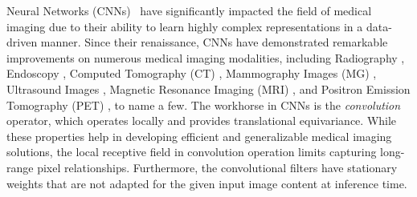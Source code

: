 \documentclass[10pt,journal,compsoc]{IEEEtran}
\begin{document}
\IEEEdisplaynontitleabstractindextext

\IEEEpeerreviewmaketitle

 Neural Networks (CNNs)~\cite{goodfellow2016deep,lecun1989backpropagation,krizhevsky2012imagenet,liu2022convnet} have significantly impacted the field of medical imaging
due to their ability to learn highly complex representations in a data-driven manner. Since their renaissance, CNNs have %
demonstrated remarkable improvements on numerous medical imaging modalities, including Radiography \cite{lakhani2017deep}, Endoscopy \cite{min2019overview}, Computed Tomography (CT) \cite{wurfl2016deep,lell2020recent}, Mammography Images (MG) \cite{hamidinekoo2018deep}, Ultrasound Images \cite{liu2019deep}, Magnetic Resonance Imaging (MRI) \cite{lundervold2019overview,akkus2017deep}, and Positron Emission Tomography (PET) \cite{reader2020deep}, to name a few.
The workhorse in CNNs is the \textit{convolution} operator, which operates locally and provides translational equivariance. While these properties help in developing efficient and generalizable medical imaging solutions, the local receptive field in convolution operation limits capturing long-range pixel relationships. Furthermore, the convolutional filters have stationary weights that are not adapted for the given input image content at inference time. 
\end{document}
